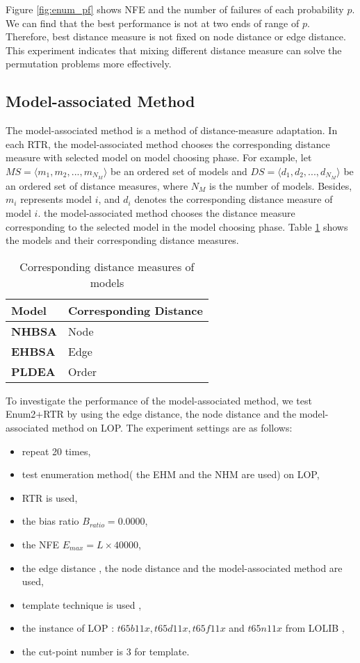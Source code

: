 Figure \ref{fig:enum_pf} shows NFE and the number of failures of each probability $p$. We can find that the best performance is not at two ends of range of $p$. Therefore,  best distance measure is not fixed on node distance or edge distance. This experiment indicates that mixing different distance measure can solve the permutation problems more effectively.

\subsection{Model-associated Method}
The model-associated method is a method of distance-measure adaptation. In each RTR, the model-associated method chooses the corresponding distance measure with selected model on model choosing phase. For example, let $MS=\langle m_1 , m_2, ..., m_{N_M}\rangle$ be an ordered set of models and $DS=\langle d_1 , d_2, ..., d_{N_M}\rangle$ be an ordered set of distance measures, where ${N_M}$ is the number of models. Besides, $m_i$ represents model $i$, and $d_i$ denotes the corresponding distance measure of model $i$. the model-associated method chooses the distance measure corresponding to the selected model in the model choosing phase. Table \ref{tb:model_distance} shows the models and their corresponding distance measures.


\begin{table}[htbp]
    \centering
    \begin{tabular}{|l|l|}
    \hline
    \textbf{Model}       & \textbf{Corresponding Distance}  \\ \hline
    \textbf{NHBSA} & Node     	 \\ \hline
    \textbf{EHBSA} & Edge   	\\ \hline
    \textbf{PLDEA} & Order   	\\ \hline
  
    \end{tabular} 
    \caption{Corresponding distance measures of models}
    \label{tb:model_distance}
\end{table}

To investigate the performance of the model-associated method, we test Enum2+RTR by using the edge distance, the node distance and the model-associated method on LOP. The experiment settings are as follows:
\begin{itemize}
    \item repeat 20 times,
    \item test enumeration method( the EHM and the NHM are used) on LOP,
    \item RTR is used,
    \item the bias ratio $B_{ratio} = 0.0000$,
    \item the NFE $E_{max} = L \times 40000$,
    \item the edge distance , the node distance and the model-associated method are used,
    \item template technique is used ,
    \item the instance of LOP : $t65b11x,t65d11x,t65f11x$ and $t65n11x$ from LOLIB ,
    \item the cut-point number is 3 for template.
\end{itemize}


